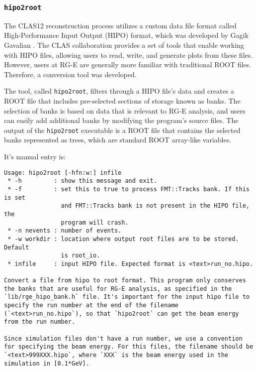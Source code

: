 \subsubsection{\texttt{hipo2root}}
\label{sssec::hipo2root}
    The CLAS12 reconstruction process utilizes a custom data file format called High-Performance Input Output (HIPO) format, which was developed by Gagik Gavalian \cite{chekanov2021}.
    The CLAS collaboration provides a set of tools that enable working with HIPO files, allowing users to read, write, and generate plots from these files.
    However, users at RG-E are generally more familiar with traditional ROOT files. Therefore, a conversion tool was developed.

    The tool, called \texttt{hipo2root}, filters through a HIPO file's data and creates a ROOT file that includes pre-selected sections of storage known as banks.
    The selection of banks is based on data that is relevant to RG-E analysis, and users can easily add additional banks by modifying the program's source files.
    The output of the \texttt{hipo2root} executable is a ROOT file that contains the selected banks represented as trees, which are standard ROOT array-like variables.

    It's manual entry is:
    \begin{lstlisting}
Usage: hipo2root [-hfn:w:] infile
 * -h         : show this message and exit.
 * -f         : set this to true to process FMT::Tracks bank. If this is set
                and FMT::Tracks bank is not present in the HIPO file, the
                program will crash.
 * -n nevents : number of events.
 * -w workdir : location where output root files are to be stored. Default
                is root_io.
 * infile     : input HIPO file. Expected format is <text>run_no.hipo.

Convert a file from hipo to root format. This program only conserves the banks that are useful for RG-E analysis, as specified in the `lib/rge_hipo_bank.h` file. It's important for the input hipo file to specify the run number at the end of the filename (`<text>run_no.hipo`), so that `hipo2root` can get the beam energy from the run number.

Since simulation files don't have a run number, we use a convention for specifying the beam energy. For this files, the filename should be `<text>999XXX.hipo`, where `XXX` is the beam energy used in the simulation in [0.1*GeV].
    \end{lstlisting}
